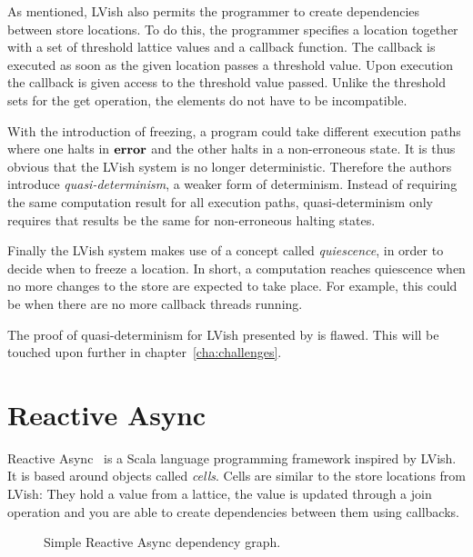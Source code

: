 As mentioned, LVish also permits the programmer to create dependencies between
store locations. To do this, the programmer specifies a location together with a
set of threshold lattice values and a callback function. The callback is
executed as soon as the given location passes a threshold value. Upon execution
the callback is given access to the threshold value passed. Unlike the threshold
sets for the get operation, the elements do not have to be incompatible. 

With the introduction of freezing, a program could take different execution
paths where one halts in $\mbox{{\bf error}}$ and the other halts in a non-erroneous state.
It is thus obvious that the LVish system is no longer deterministic. Therefore
the authors introduce \emph{quasi-determinism}, a weaker form of
determinism. Instead of requiring the same computation result for all execution
paths, quasi-determinism only requires that results be the same for
non-erroneous halting states.

Finally the LVish system makes use of a concept called \emph{quiescence}, in
order to decide when to freeze a location. In short, a computation reaches
quiescence when no more changes to the store are expected to take place. For
example, this could be when there are no more callback threads running.

The proof of quasi-determinism for LVish presented by
\textcite{kuper2014freezeTR} is flawed. This will be touched upon further in
chapter~\ref{cha:challenges}.


\section{Reactive Async}\label{sec:reactive_async}

Reactive Async~\parencite{conf/scala/HallerGES16} is a Scala language
programming framework inspired by LVish. It is based around objects called
\emph{cells}.  Cells are similar to the store locations from LVish: They hold a
value from a lattice, the value is updated through a join operation and you are
able to create dependencies between them using callbacks.

\begin{figure}
  \centering
  \caption{Simple Reactive Async dependency graph.}
  \label{fig:ra_example}
\end{figure}

